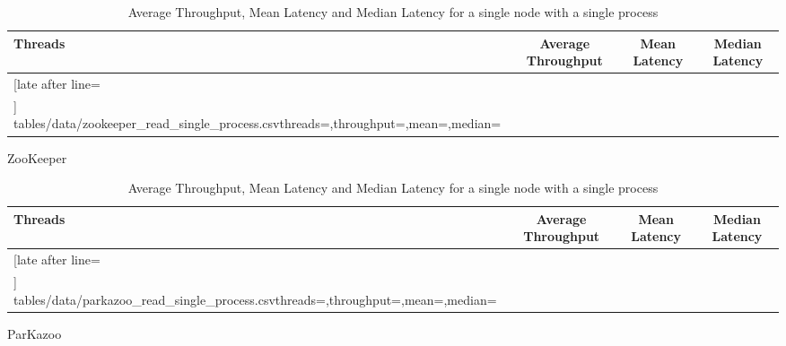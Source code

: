 \begin{table}[ht!]
	\centering
	\begin{subtable}[t]{1.0\linewidth}
		\centering
		\begin{tabular}{|l|c|c|c|}\hline%
			\textbf{Threads} & \textbf{Average Throughput} & \textbf{Mean Latency} & \textbf{Median Latency} \\\hline
			\csvreader[late after line=\\\hline]%
			{tables/data/zookeeper_read_single_process.csv}{threads=\threads,throughput=\throughput,mean=\mean,median=\median}%
			{\threads & \throughput & \mean & \median}%
		\end{tabular}
		\caption{ZooKeeper}
		\label{tab:zookeeper_single_process_read_throughput}
	\end{subtable}
	\begin{subtable}[t]{1.0\linewidth}
		\centering
		\begin{tabular}{|l|c|c|c|}\hline%
			\textbf{Threads} & \textbf{Average Throughput} & \textbf{Mean Latency} & \textbf{Median Latency} \\\hline
			\csvreader[late after line=\\\hline]%
			{tables/data/parkazoo_read_single_process.csv}{threads=\threads,throughput=\throughput,mean=\mean,median=\median}%
			{\threads & \throughput & \mean & \median}%
		\end{tabular}
		\caption{ParKazoo}
		\label{tab:parkazoo_single_process_read_throughput}
	\end{subtable}
	\caption{Average Throughput, Mean Latency and Median Latency for a single node with a single process}
	\label{table:single_process_read_throughput}
\end{table}
